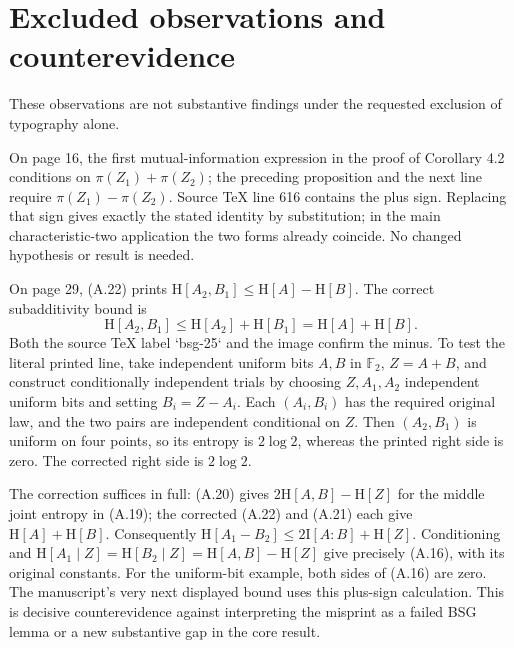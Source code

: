 \documentclass[10pt]{article}
\begin{document}
\section*{Excluded observations and counterevidence}
These observations are not substantive findings under the requested exclusion of typography alone.\par
On page 16, the first mutual-information expression in the proof of Corollary 4.2 conditions on \(\pi(Z_1)+\pi(Z_2)\); the preceding proposition and the next line require \(\pi(Z_1)-\pi(Z_2)\). Source TeX line 616 contains the plus sign. Replacing that sign gives exactly the stated identity by substitution; in the main characteristic-two application the two forms already coincide. No changed hypothesis or result is needed.\par
On page 29, (A.22) prints \(\mathrm H[A_2,B_1]\le\mathrm H[A]-\mathrm H[B]\). The correct subadditivity bound is \[\mathrm H[A_2,B_1]\le\mathrm H[A_2]+\mathrm H[B_1]=\mathrm H[A]+\mathrm H[B].\] Both the source TeX label `bsg-25` and the image confirm the minus. To test the literal printed line, take independent uniform bits \(A,B\) in \(\mathbb F_2\), \(Z=A+B\), and construct conditionally independent trials by choosing \(Z,A_1,A_2\) independent uniform bits and setting \(B_i=Z-A_i\). Each \((A_i,B_i)\) has the required original law, and the two pairs are independent conditional on \(Z\). Then \((A_2,B_1)\) is uniform on four points, so its entropy is \(2\log2\), whereas the printed right side is zero. The corrected right side is \(2\log2\).\par
The correction suffices in full: (A.20) gives \(2\mathrm H[A,B]-\mathrm H[Z]\) for the middle joint entropy in (A.19); the corrected (A.22) and (A.21) each give \(\mathrm H[A]+\mathrm H[B]\). Consequently \(\mathrm H[A_1-B_2]\le2\mathrm I[A:B]+\mathrm H[Z]\). Conditioning and \(\mathrm H[A_1\mid Z]=\mathrm H[B_2\mid Z]=\mathrm H[A,B]-\mathrm H[Z]\) give precisely (A.16), with its original constants. For the uniform-bit example, both sides of (A.16) are zero. The manuscript’s very next displayed bound uses this plus-sign calculation. This is decisive counterevidence against interpreting the misprint as a failed BSG lemma or a new substantive gap in the core result.\par
\end{document}

